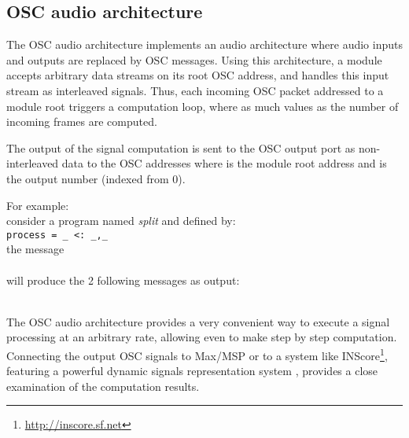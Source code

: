 \subsection{OSC audio architecture}
\label{sec:oscaudio}

The OSC audio architecture implements an audio architecture where audio inputs and outputs are replaced by OSC messages. Using this architecture, a \faust module accepts arbitrary data streams on its root OSC address, and handles this input stream as interleaved signals. Thus, each incoming OSC packet addressed to a module root triggers a computation loop, where as much values as the number of incoming frames are computed.

The output of the signal computation is sent to the OSC output port as non-interleaved data to the OSC addresses  where  is the module root address and  is the output number (indexed from 0).

For example: \\
consider a \faust program named \emph{split} and defined by:\\
\hspace*{6mm} \lstinline'process = _ <: _,_' \\
the message \\
\hspace*{6mm} 
\\ will produce the 2 following messages as output: \\
\hspace*{6mm}\\
\hspace*{6mm}


The OSC audio architecture provides a very convenient way to execute a signal processing at an arbitrary rate, allowing even to make step by step computation. Connecting the output OSC signals to Max/MSP or to a system like INScore\footnote{\url{http://inscore.sf.net}}, featuring a powerful dynamic signals representation system \cite{Fober:10c}, provides a close examination of the computation results.

